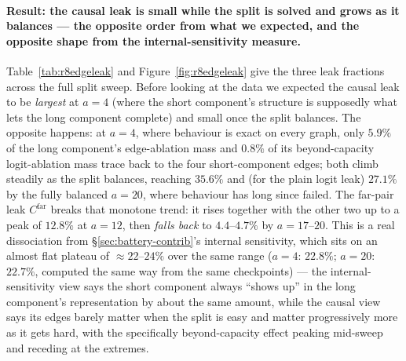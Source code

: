 \documentclass[11pt,a4paper]{article}
\begin{document}
\paragraph{Result: the causal leak is small while the split is solved and grows as it
balances --- the opposite order from what we expected, and the opposite
shape from the internal-sensitivity measure.} Table~\ref{tab:r8edgeleak} and
Figure~\ref{fig:r8edgeleak} give the three leak fractions across the full
split sweep. Before looking at the data we expected the causal leak to be
\emph{largest} at $a=4$ (where the short component's structure is supposedly
what lets the long component complete) and small once the split balances.
The opposite happens: at $a=4$, where behaviour is exact on every graph, only
$5.9\%$ of the long component's edge-ablation mass and $0.8\%$ of its
beyond-capacity logit-ablation mass trace back to the four short-component
edges; both climb steadily as the split balances, reaching $35.6\%$ and
(for the plain logit leak) $27.1\%$ by the fully balanced $a=20$, where
behaviour has long since failed. The far-pair leak $C^{\mathrm{far}}$ breaks
that monotone trend: it rises together with the other two up to a peak of
$12.8\%$ at $a=12$, then \emph{falls back} to $4.4$--$4.7\%$ by $a=17$--$20$.
This is a real dissociation from \S\ref{sec:battery-contrib}'s internal
sensitivity, which sits on an almost flat plateau of $\approx22$--$24\%$ over
the same range ($a=4$: $22.8\%$; $a=20$: $22.7\%$, computed the same way from
the same checkpoints) --- the internal-sensitivity view says the short
component always ``shows up'' in the long component's representation by
about the same amount, while the causal view says its edges barely matter
when the split is easy and matter progressively more as it gets hard, with
the specifically beyond-capacity effect peaking mid-sweep and receding at the
extremes.
\end{document}
